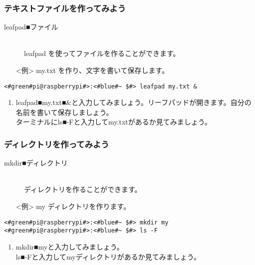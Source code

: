 \subsubsection{テキストファイルを作ってみよう}
\begin{description}
\item[leafpad■ファイル]\mbox{}\\
leafpad を使ってファイルを作ることができます。
\end{description}
\begin{itemize}
\item[<例>]my.txt を作り、文字を書いて保存します。
\end{itemize}
\begin{lstlisting}[caption=leafpadの例, label=leafpad]
<#green#pi@raspberrypi#>:<#blue#~ $#> leafpad my.txt &
\end{lstlisting}
\begin{tcolorbox}[title=\useOmetoi]
\begin{enumerate}
\item leafpad■my.txt■\&と入力してみましょう。リーフパッドが開きます。自分の名前を書いて保存しましょう。\\ターミナルにls■-Fと入力してmy.txtがあるか見てみましょう。\\
\end{enumerate}
\end{tcolorbox}

\subsubsection{ディレクトリを作ってみよう}
\begin{description}
\item[mkdir■ディレクトリ]\mbox{}\\
ディレクトリを作ることができます。
\end{description}
\begin{itemize}
\item[<例>]my ディレクトリを作ります。
\end{itemize}
\begin{lstlisting}[caption=mkdirの例, label=mkdir]
<#green#pi@raspberrypi#>:<#blue#~ $#> mkdir my
<#green#pi@raspberrypi#>:<#blue#~ $#> ls -F
\end{lstlisting}
\begin{tcolorbox}[title=\useOmetoi]
\begin{enumerate}
\item mkdir■myと入力してみましょう。\\ls■-Fと入力してmyディレクトリがあるか見てみましょう。\\
\end{enumerate}
\end{tcolorbox}

